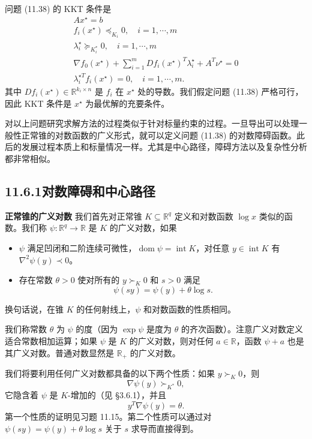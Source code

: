 \documentclass[UTF8, 12pt, fontset=fandol, oneside]{ctexart}
\begin{document}
问题 (11.38) 的 KKT 条件是
\begin{equation}
\begin{gathered}
Ax^\star=b\\
f_i(x^\star)\preceq_{K_i}0,\quad i=1,\cdots,m\\
\lambda_i^\star\succeq_{K_i^\ast}0,\quad i=1,\cdots,m\\
\nabla f_0(x^\star)+\sum_{i=1}^m Df_i(x^\star)^T\lambda_i^\star+A^T\nu^\star=0\\
\lambda_i^{\star T}f_i(x^\star)=0,\quad i=1,\cdots,m.
\end{gathered}
\tag{11.39}
\end{equation}
其中 $Df_i(x^\star)\in\mathbb{R}^{k_i\times n}$ 是 $f_i$ 在 $x^\star$ 处的导数。我们假定问题 (11.38) 严格可行，因此 KKT 条件是 $x^\star$ 为最优解的充要条件。

对以上问题研究求解方法的过程类似于针对标量约束的过程。一旦导出可以处理一般性正常锥的对数函数的广义形式，就可以定义问题 (11.38) 的对数障碍函数。此后的发展过程本质上和标量情况一样。尤其是中心路径，障碍方法以及复杂性分析都非常相似。

\subsection*{11.6.1\quad 对数障碍和中心路径}

\noindent\textbf{正常锥的广义对数}\quad
我们首先对正常锥 $K\subseteq\mathbb{R}^q$ 定义和对数函数 $\log x$ 类似的函数。我们称 $\psi:\mathbb{R}^q\to\mathbb{R}$ 是 $K$ 的广义对数，如果

\begin{itemize}
\item $\psi$ 满足凹闭和二阶连续可微性，$\operatorname{dom}\psi=\operatorname{int}K$，对任意 $y\in\operatorname{int}K$ 有 $\nabla^2\psi(y)\prec 0$。
\item 存在常数 $\theta>0$ 使对所有的 $y\succ_K0$ 和 $s>0$ 满足
\[
\psi(sy)=\psi(y)+\theta\log s.
\]
\end{itemize}

换句话说，在锥 $K$ 的任何射线上，$\psi$ 和对数函数的性质相同。

我们称常数 $\theta$ 为 $\psi$ 的度（因为 $\exp\psi$ 是度为 $\theta$ 的齐次函数）。注意广义对数定义适合常数相加运算；如果 $\psi$ 是 $K$ 的广义对数，则对任何 $a\in\mathbb{R}$，函数 $\psi+a$ 也是其广义对数。普通对数显然是 $\mathbb{R}_+$ 的广义对数。

我们将要利用任何广义对数都具备的以下两个性质：如果 $y\succ_K0$，则
\begin{equation}
\nabla\psi(y)\succ_{K^\ast}0,
\tag{11.40}
\end{equation}
它隐含着 $\psi$ 是 $K$-增加的（见 \S3.6.1），并且
\[
y^T\nabla\psi(y)=\theta.
\]
第一个性质的证明见习题 11.15。第二个性质可以通过对 $\psi(sy)=\psi(y)+\theta\log s$ 关于 $s$ 求导而直接得到。
\end{document}
